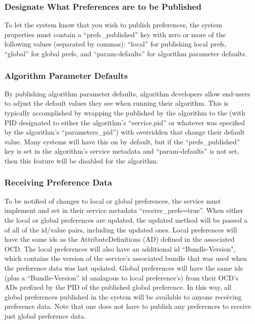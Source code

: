 \subsubsection*{Designate What Preferences are to be Published} To let the system
know that you wish to publish preferences, the system properties must contain a
``prefs\_published'' key with zero or more of the following values (separated by
commas): ``local'' for publishing local prefs, ``global'' for global prefs, and
``param-defaults'' for algorithm parameter defaults.

\subsubsection*{Algorithm Parameter Defaults} By publishing algorithm parameter
defaults, algorithm developers allow end-users to adjust the default values they
see when running their algorithm. This is typically accomplished by wrapping the
 published by the algorithm to the
 (with PID designated to either the algorithm's
``service.pid'' or whatever was specified by the algorithm's ``parameters\_pid'')
with overridden  that change their default value.
Many systems will have this on by default, but if the ``prefs\_published'' key is
set in the algorithm's service metadata and ``param-defaults'' is not set, then
this feature will be disabled for the algorithm.

\subsubsection*{Receiving Preference Data} To be notified of changes to local or
global preferences, the service must implement
 and set in their service
metadata ``receive\_prefs=true''. When either the local or global preferences are updated,
the updated method will be passed a  of all of the id/value
pairs, including the updated ones. Local preferences will have the same ids as
the AttributeDefinitions (AD) defined in the associated OCD. The local
preferences will also have an additional id ``Bundle-Version", which contains the
version of the service's associated bundle that was used when the preference data
was last updated. Global preferences will have the same ids (plus a
``Bundle-Version'' id analagous to local preference's) from their OCD's ADs
prefixed by the PID of the published global preference. In this way, all global
preferences published in the system will be available to anyone receiving
preference data. Note that one does not have to publish any preferences to
receive just global preference data.
